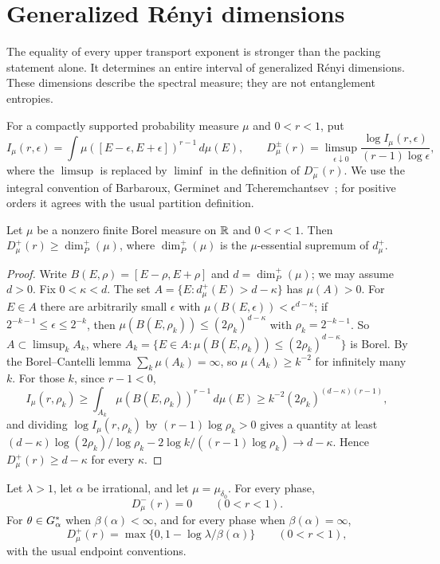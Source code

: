 \section{Generalized R\'enyi dimensions}\label{sec:renyi}

The equality of every upper transport exponent is stronger than the packing statement alone. It determines an entire interval of generalized R\'enyi dimensions. These dimensions describe the spectral measure; they are not entanglement entropies.

For a compactly supported probability measure $\mu$ and $0<r<1$, put
\[
I_\mu(r,\epsilon)=\int \mu([E-\epsilon,E+\epsilon])^{r-1}\,d\mu(E),
\qquad
D_\mu^\pm(r)=\limsup_{\epsilon\downarrow0}\!
\frac{\log I_\mu(r,\epsilon)}{(r-1)\log\epsilon},
\]
where the $\limsup$ is replaced by $\liminf$ in the definition of $D_\mu^-(r)$.
We use the integral convention of Barbaroux, Germinet and Tcheremchantsev~\cite{BGT2000}; for positive orders it agrees with the usual partition definition.

\begin{lemma}\label{lem:renyipacking}
Let $\mu$ be a nonzero finite Borel measure on $\mathbb R$ and $0<r<1$. Then $D^+_\mu(r)\ge\dim_P^+(\mu)$, where $\dim_P^+(\mu)$ is the $\mu$-essential supremum of $d^+_\mu$.
\end{lemma}
\begin{proof}
Write $B(E,\rho)=[E-\rho,E+\rho]$ and $d=\dim_P^+(\mu)$; we may assume $d>0$. Fix $0<\kappa<d$. The set $A=\{E:d^+_\mu(E)>d-\kappa\}$ has $\mu(A)>0$. For $E\in A$ there are arbitrarily small $\epsilon$ with $\mu(B(E,\epsilon))<\epsilon^{d-\kappa}$; if $2^{-k-1}\le\epsilon\le2^{-k}$, then $\mu(B(E,\rho_k))\le(2\rho_k)^{d-\kappa}$ with $\rho_k=2^{-k-1}$. So $A\subset\limsup_kA_k$, where $A_k=\{E\in A:\mu(B(E,\rho_k))\le(2\rho_k)^{d-\kappa}\}$ is Borel. By the Borel--Cantelli lemma $\sum_k\mu(A_k)=\infty$, so $\mu(A_k)\ge k^{-2}$ for infinitely many $k$. For those $k$, since $r-1<0$,
\[
I_\mu(r,\rho_k)\ge\int_{A_k}\mu(B(E,\rho_k))^{r-1}\,d\mu(E)\ge k^{-2}(2\rho_k)^{(d-\kappa)(r-1)} ,
\]
and dividing $\log I_\mu(r,\rho_k)$ by $(r-1)\log\rho_k>0$ gives a quantity at least $(d-\kappa)\log(2\rho_k)/\log\rho_k-2\log k/((r-1)\log\rho_k)\to d-\kappa$. Hence $D^+_\mu(r)\ge d-\kappa$ for every $\kappa$.
\end{proof}

\begin{theorem}\label{thm:renyi}
Let $\lambda>1$, let $\alpha$ be irrational, and let $\mu=\mu_{\delta_0}$.
For every phase,
\[
D_\mu^-(r)=0\qquad(0<r<1).
\]
For $\theta\in G_\alpha^*$ when $\beta(\alpha)<\infty$, and for every phase when $\beta(\alpha)=\infty$,
\[
D_\mu^+(r)=\max\{0,1-\log\lambda/\beta(\alpha)\}
\qquad(0<r<1),
\]
with the usual endpoint conventions.
\end{theorem}

